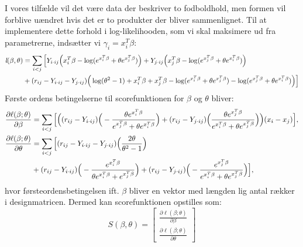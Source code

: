 \documentclass[11pt,a4paper]{article}
\begin{document}
I vores tilfælde vil det være data der beskriver to fodboldhold, men formen vil forblive uændret hvis det er to produkter der bliver sammenlignet.
Til at implementere dette forhold i log-likelihooden, som vi skal maksimere ud fra parametrerne, indsætter vi $\gamma_i=x_i^T\beta$:
\begin{align*}
\textit{l}(\beta,\theta)
&=\sum_{i<j}\Big{[}Y_{i\cdot ij}\Big{(}x_i^T\beta-\log(e^{x_i^T\beta}+\theta e^{x_j^T\beta})\Big{)}
+Y_{j\cdot ij}\Big{(}x_j^T\beta-\log(e^{x_j^T\beta}+\theta e^{x_i^T\beta})\Big{)}\\
& +(r_{ij}-Y_{i\cdot ij}-Y_{j\cdot ij}) \Big{(} \log(\theta^2-1)+x_i^T\beta+x_j^T\beta-\log(e^{x_i^T\beta}+\theta e^{x_j^T\beta})-\log(e^{x_j^T\beta}+\theta e^{x_i^T\beta})\Big{)}\Big{]}
\end{align*}
Første ordens betingelserne til scorefunktionen for $\beta$ og $\theta$ bliver:
\begin{align*}
\frac{\partial \ell(\beta;\theta)}{\partial \beta}&= 
\sum_{i<j}\Big{[}\Big{(}
(r_{ij}-Y_{i\cdot ij})\Big{(}-\frac{\theta e^{x_i^T\beta}}{e^{x_j^T\beta}+\theta e^{x_i^T\beta}}\Big{)}+(r_{ij}-Y_{j\cdot ij})\Big{(}\frac{\theta e^{x_j^T\beta}}{e^{x_i^T\beta}+\theta e^{x_j^T\beta}}\Big{)}\Big{)}(x_i-x_j)\Big{]},\\
\frac{\partial \ell(\beta;\theta)}{\partial \theta}&=
\sum_{i<j}
\Big{[}
 (r_{ij}-Y_{i\cdot ij}-Y_{j\cdot ij})\Big{(}\frac{2\theta}{\theta^2-1}\Big{)}\\
 &+(r_{ij}-Y_{i\cdot ij})\Big{(}-\frac{e^{x_i^T\beta}}{\theta e^{x_i^T\beta}+e^{x_j^T\beta}}\Big{)}
 +(r_{ij}-Y_{j\cdot ij})\Big{(}-\frac{e^{x_j^T\beta}}{e^{x_i^T\beta}+\theta e^{x_j^T\beta}}\Big{)}
\Big{]},\\
\end{align*}
hvor førsteordensbetingelsen ift. $\beta$ bliver en vektor med længden lig antal rækker i designmatricen. Dermed kan scorefunktionen opstilles som:
\begin{equation}
S(\beta,\theta) = \begin{bmatrix}
\frac{\partial \ell(\beta;\theta)}{\partial \beta}\\
\frac{\partial \ell(\beta;\theta)}{\partial \theta}
\end{bmatrix}
\label{score}
\end{equation}
\end{document}
